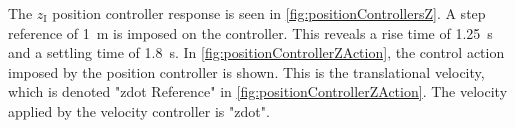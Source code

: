 \begin{minipage}{\linewidth}
\begin{minipage}{0.45\linewidth}
\begin{figure}[H]
            \centering
            \label{fig:velocityControllerZAction}
        \end{figure}
    \end{minipage}
\end{minipage}

The $z_{\mathrm{I}}$ position controller response is seen in \autoref{fig:positionControllersZ}. A step reference of \SI{1}{m} is imposed on the controller. This reveals a rise time of \SI{1.25}{s} and a settling time of \SI{1.8}{s}. In \autoref{fig:positionControllerZAction}, the control action imposed by the position controller is shown. This is the translational velocity, which is denoted "zdot Reference" in \autoref{fig:positionControllerZAction}. The velocity applied by the velocity controller is "zdot".

